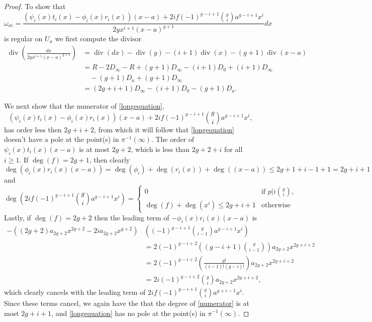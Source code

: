 \documentclass[draft, 11pt]{article} %
\theoremstyle{plain}
\theoremstyle{remark}
\DeclareMathOperator{\di}{div}
\begin{document}
\begin{proof}
To show that
\begin{equation}\label{longequation}
\omega_{\sigma i} =  \frac{(\psi_i(x)t_i(x) - \phi_i(x)r_i(x))(x-a) + 2if(-1)^{g-i+1}\binom{g}{i} a^{g-i+1}x^i}{2yx^{i+1}(x-a)^{g+1}}dx
\end{equation}
is regular on $U_\sigma$ we first compute the divisor
\begin{align*}
\di\left( \frac{dx}{2yx^{i+1}(x-a)^{g+1}}\right) & = \di(dx) - \di(y) - (i+1)\di(x) - (g+1)\di(x-a) \\
& = R - 2D_\infty - R + (g+1)D_\infty - (i+1)D_0 + (i+1)D_\infty \\
& \quad - (g+1)D_a + (g+1)D_\infty \\
& = (2g+i+1)D_\infty -(i+1)D_0 - (g+1)D_a.
\end{align*}

We next show that the numerator of \eqref{longequation},
\begin{equation}\label{numerator}
{(\psi_i(x)t_i(x) - \phi_i(x)r_i(x))(x-a) + 2if(-1)^{g-i+1}\binom{g}{i} a^{g-i+1}x^i},
\end{equation}
has order less then $2g+i+2$, from which it will follow that \eqref{longequation} doesn't have a pole at the point(s) in $\pi^{-1}(\infty)$.
The order of $\psi_i(x)t_i(x)(x-a)$ is at most $2g+2$, which is less than $2g+2+i$ for all $i \geq 1$.
If $\deg(f) = 2g+1$, then clearly
\[
\deg\left( \phi_i(x)r_i(x)(x-a) \right) = \deg(\phi_i) + \deg(r_i(x)) + \deg((x-a)) \leq 2g+1 + i-1 +1 = 2g+i+1
\]
and
\[
\deg \left( 2if(-1)^{g-i+1}\binom{g}{i} a^{g-i+1}x^i \right)  = \begin{cases} 0 & \text {if } p|i\binom{g}{i}, \\
 \deg(f) + \deg(x^i) \leq 2g+i+1 & \text{otherwise}
\end{cases}
\]
Lastly, if $\deg(f) = 2g+2$ then the leading term of $-\phi_i(x)r_i(x)(x-a)$ is
\begin{align*}
-((2g+2)a_{2g+2}x^{2g+2}-2ia_{2g+2}x^{g+2})&\left( (-1)^{g-i+1}\binom{g}{i-1}a^{g-i+1}x^i\right) \\
&  = 2(-1)^{g-i+2}\left( (g-i+1)\binom{g}{i-1} \right) a_{2g+2}x^{2g+i+2} \\
& = 2(-1)^{g-i+2} \left( \frac{g!}{(i-1)!(g-i)!} \right) a_{2g+2}x^{2g+i+2} \\
& = 2i(-1)^{g-i+2}\binom{g}{i}a_{2g+2}x^{2g+i+2},
\end{align*}
which clearly cancels with the leading term of $2if(-1)^{g-i+1}\binom{g}{i}a^{g+i-1}x^i$.
Since these terms cancel, we again have the that the degree of \eqref{numerator} is at most $2g+i+1$, and \eqref{longequation} has no pole at the point(s) in $\pi^{-1}(\infty)$.


\end{proof}
\end{document}
